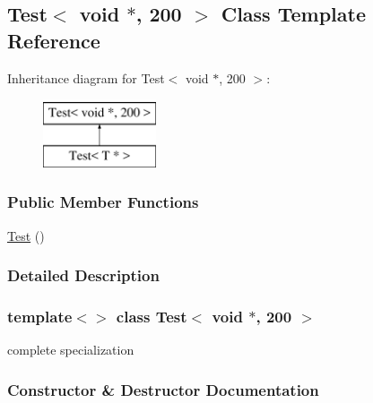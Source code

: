 \hypertarget{class_test_3_01void_01_5_00_01200_01_4}{}\subsection{Test$<$ void $\ast$, 200 $>$ Class Template Reference}
\label{class_test_3_01void_01_5_00_01200_01_4}
Inheritance diagram for Test$<$ void $\ast$, 200 $>$\+:\begin{figure}[H]
\begin{center}
\leavevmode
\includegraphics[height=2.000000cm]{class_test_3_01void_01_5_00_01200_01_4}
\end{center}
\end{figure}
\subsubsection*{Public Member Functions}
\begin{DoxyCompactItemize}
\item 
\mbox{\hyperlink{class_test_3_01void_01_5_00_01200_01_4_aef160085cc11406b872b45fa871c7692}{Test}} ()
\end{DoxyCompactItemize}


\subsubsection{Detailed Description}
\subsubsection*{template$<$$>$\newline
class Test$<$ void $\ast$, 200 $>$}

complete specialization 

\subsubsection{Constructor \& Destructor Documentation}
\mbox{\label{class_test_3_01void_01_5_00_01200_01_4_aef160085cc11406b872b45fa871c7692}} 

